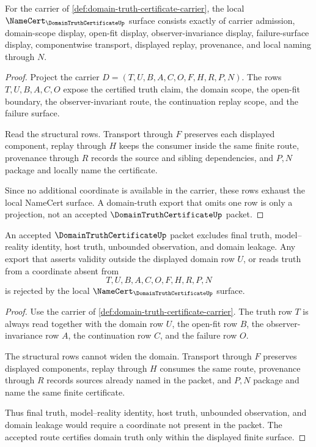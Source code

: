 \begin{theorem}
\label{thm:domain-truth-certificate-obligations}
For the carrier of \autoref{def:domain-truth-certificate-carrier}, the local $\NameCert_{\DomainTruthCertificateUp}$ surface consists exactly of carrier admission, domain-scope display, open-fit display, observer-invariance display, failure-surface display, componentwise transport, displayed replay, provenance, and local naming through $N$.
\end{theorem}
\begin{proof}
Project the carrier $D=(T,U,B,A,C,O,F,H,R,P,N)$. The rows $T,U,B,A,C,O$ expose the certified truth claim, the domain scope, the open-fit boundary, the observer-invariant route, the continuation replay scope, and the failure surface.

Read the structural rows. Transport through $F$ preserves each displayed component, replay through $H$ keeps the consumer inside the same finite route, provenance through $R$ records the source and sibling dependencies, and $P,N$ package and locally name the certificate.

Since no additional coordinate is available in the carrier, these rows exhaust the local NameCert surface. A domain-truth export that omits one row is only a projection, not an accepted $\DomainTruthCertificateUp$ packet.
\end{proof}

\begin{theorem}
\label{thm:domain-truth-certificate-nonescape}
An accepted $\DomainTruthCertificateUp$ packet excludes final truth, model--reality identity, host truth, unbounded observation, and domain leakage. Any export that asserts validity outside the displayed domain row $U$, or reads truth from a coordinate absent from
$$
T,U,B,A,C,O,F,H,R,P,N
$$
is rejected by the local $\NameCert_{\DomainTruthCertificateUp}$ surface.
\end{theorem}
\begin{proof}
Use the carrier of \autoref{def:domain-truth-certificate-carrier}. The truth row $T$ is always read together with the domain row $U$, the open-fit row $B$, the observer-invariance row $A$, the continuation row $C$, and the failure row $O$.

The structural rows cannot widen the domain. Transport through $F$ preserves displayed components, replay through $H$ consumes the same route, provenance through $R$ records sources already named in the packet, and $P,N$ package and name the same finite certificate.

Thus final truth, model--reality identity, host truth, unbounded observation, and domain leakage would require a coordinate not present in the packet. The accepted route certifies domain truth only within the displayed finite surface.
\end{proof}

